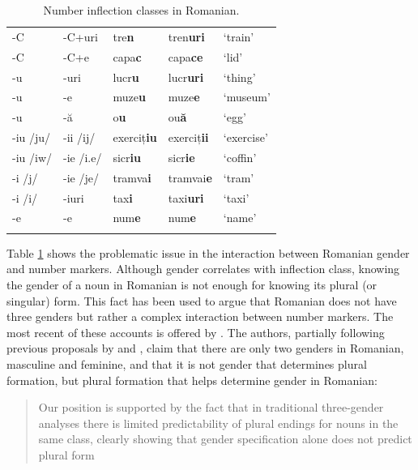 \begin{table}[!htbp]
\begin{tabular}{lllll}
    \midrule
    -C         & -C+uri     & tre\textbf{n}      & tren\textbf{uri}   & `train'          \\
    -C         & -C+e       & capa\textbf{c}     & capa\textbf{ce}    & `lid'            \\
    -u         & -uri       & lucr\textbf{u}     & lucr\textbf{uri}   & `thing'          \\
    -u         & -e         & muze\textbf{u}     & muze\textbf{e}     & `museum'         \\
    -u         & -ă         & o\textbf{u}        & ou\textbf{ă}       & `egg'            \\
    -iu /ju/   & -ii /ij/   & exerciț\textbf{iu} & exerciț\textbf{ii} & `exercise'       \\
    -iu /iw/   & -ie /i.e/  & sicr\textbf{iu}    & sicr\textbf{ie}    & `coffin'         \\
    -i  /j/    & -ie /je/   & tramva\textbf{i}   & tramvai\textbf{e}  & `tram'           \\
    -i  /i/    & -iuri      & tax\textbf{i}      & taxi\textbf{uri}   & `taxi'           \\
    -e         & -e         & num\textbf{e}      & num\textbf{e}      & `name'           \\
    \lspbottomrule
  \end{tabular}\caption{Number inflection classes in Romanian.}\label{tab:romanian-plural-clases}
\end{table}

Table \ref{tab:romanian-plural-clases} shows the problematic issue in the interaction between Romanian gender and number markers. Although gender correlates with inflection class, knowing the gender of a noun in Romanian is not enough for knowing its plural (or singular) form. This fact has been used to argue that Romanian does not have three genders but rather a complex interaction between number markers. The most recent of these accounts is offered by \textcite{Bateman.2010}. The authors, partially following previous proposals by \textcite{Hall.1965} and \textcite{Farkas.1995}, claim that there are only two genders in Romanian, masculine and feminine, and that it is not gender that determines plural formation, but plural formation that helps determine gender in Romanian:

\nocite{Gerdts.2010} %

\begin{quotation}
Our position is supported by the fact that in traditional three-gender analyses there is limited predictability of plural endings for nouns in the same class, clearly showing that gender specification alone does not predict plural form \autocite[p. 53]{Bateman.2010}
\end{quotation}

